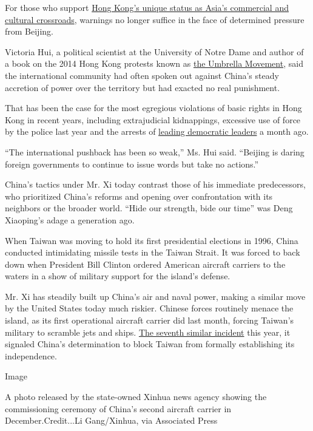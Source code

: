 For those who support
\href{https://www.nytimes3xbfgragh.onion/2020/05/23/world/asia/hong-kong-china.html}{Hong
Kong's unique status as Asia's commercial and cultural crossroads},
warnings no longer suffice in the face of determined pressure from
Beijing.

Victoria Hui, a political scientist at the University of Notre Dame and
author of a book on the 2014 Hong Kong protests known as
\href{https://www.nytimes3xbfgragh.onion/2019/04/23/world/asia/hong-kong-umbrella-movement.html}{the
Umbrella Movement}, said the international community had often spoken
out against China's steady accretion of power over the territory but had
exacted no real punishment.

That has been the case for the most egregious violations of basic rights
in Hong Kong in recent years, including extrajudicial kidnappings,
excessive use of force by the police last year and the arrests of
\href{https://www.nytimes3xbfgragh.onion/2020/04/18/world/asia/hong-kong-arrests.html}{leading
democratic leaders} a month ago.

``The international pushback has been so weak,'' Ms. Hui said. ``Beijing
is daring foreign governments to continue to issue words but take no
actions.''

China's tactics under Mr. Xi today contrast those of his immediate
predecessors, who prioritized China's reforms and opening over
confrontation with its neighbors or the broader world. ``Hide our
strength, bide our time'' was Deng Xiaoping's adage a generation ago.

When Taiwan was moving to hold its first presidential elections in 1996,
China conducted intimidating missile tests in the Taiwan Strait. It was
forced to back down when President Bill Clinton ordered American
aircraft carriers to the waters in a show of military support for the
island's defense.

Mr. Xi has steadily built up China's air and naval power, making a
similar move by the United States today much riskier. Chinese forces
routinely menace the island, as its first operational aircraft carrier
did last month, forcing Taiwan's military to scramble jets and ships.
\href{https://www.youtube.com/watch?v=PUj-vrQTT84}{The seventh similar
incident} this year, it signaled China's determination to block Taiwan
from formally establishing its independence.

Image

A photo released by the state-owned Xinhua news agency showing the
commissioning ceremony of China's second aircraft carrier in
December.Credit...Li Gang/Xinhua, via Associated Press

